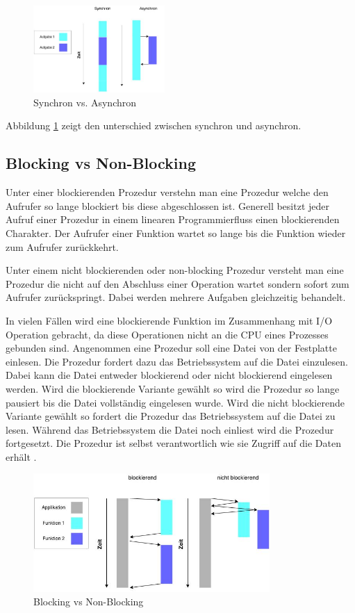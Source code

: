 \begin{figure}[!htb]
  \centering
  \includegraphics[width=5cm]{images/synchron_vs_asynchron.jpg}
  \caption{
    Synchron vs. Asynchron
  }
  \label{figure:syncron_vs_async}
\end{figure}

Abbildung \ref{figure:syncron_vs_async} zeigt den unterschied zwischen synchron und asynchron. 

\subsection{Blocking vs Non-Blocking}

Unter einer blockierenden Prozedur verstehn man eine Prozedur welche den Aufrufer so lange blockiert bis diese abgeschlossen ist. Generell besitzt jeder Aufruf einer Prozedur in einem linearen Programmierfluss einen blockierenden Charakter. Der Aufrufer einer Funktion wartet so lange bis die Funktion wieder zum Aufrufer zurückkehrt. 

Unter einem nicht blockierenden oder non-blocking Prozedur versteht man eine Prozedur die nicht auf den Abschluss einer Operation wartet sondern sofort zum Aufrufer zurückspringt. Dabei werden mehrere Aufgaben gleichzeitig behandelt.  

In vielen Fällen wird eine blockierende Funktion im Zusammenhang mit I/O Operation gebracht, da diese Operationen nicht an die CPU eines Prozesses gebunden sind. Angenommen eine Prozedur soll eine Datei von der Festplatte einlesen. Die Prozedur fordert dazu das Betriebssystem auf die Datei einzulesen. Dabei kann die Datei entweder blockierend oder nicht blockierend eingelesen werden. Wird die blockierende Variante gewählt so wird die Prozedur so lange pausiert bis die Datei vollständig eingelesen wurde. Wird die nicht blockierende Variante gewählt so fordert die Prozedur das Betriebssystem auf die Datei zu lesen. Während das Betriebssystem die Datei noch einliest wird die Prozedur fortgesetzt. Die Prozedur ist selbst verantwortlich wie sie Zugriff auf die Daten erhält \cite[p. 47]{Erb2012}.

\begin{figure}[!htb]
  \centering
  \includegraphics[width=9cm]{images/blocking_vs_nonblocking.jpg}
  \caption{
    Blocking vs Non-Blocking
  }
  \label{figure:blocking_vs_non_blocking}
\end{figure}

